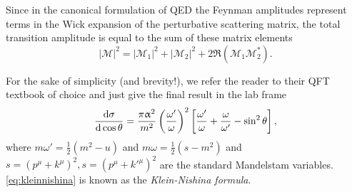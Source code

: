Since in the canonical formulation of QED the Feynman amplitudes represent terms in the Wick expansion of the perturbative scattering matrix, the total transition amplitude is equal to the sum of these matrix elements
\begin{equation*}
	|\mathcal{M}|^2 = |\mathcal{M}_1|^2 + |\mathcal{M}_2|^2 + 2\Re\left(\mathcal{M}_1\mathcal{M}_2^*\right).
\end{equation*}

For the sake of simplicity (and brevity!), we refer the reader to their QFT textbook of choice and just give the final result in the lab frame
\begin{equation}\label{eq:kleinnishina}
	\frac{\text{d}\sigma}{\text{d}\cos\theta} = \frac{\pi\upalpha^2}{m^2}\left(\frac{\omega'}{\omega}\right)^2\left[\frac{\omega'}{\omega} + \frac{\omega}{\omega'} - \sin^2\theta\right],
\end{equation}
where $m\omega' = \frac{1}{2}\left(m^2-u\right)$ and $m\omega = \frac{1}{2}\left(s-m^2\right)$ and $s=\left(p^\mu + k^\mu\right)^2, s=\left(p^\mu + k'^\mu\right)^2$ are the standard Mandelstam variables.
\autoref{eq:kleinnishina} is known as the \textit{Klein-Nishina formula}.
